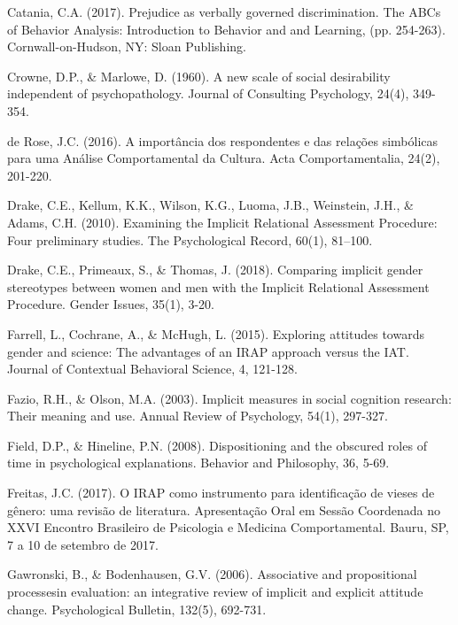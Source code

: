 \hangindent=25pt
\noindent Catania, C.A. (2017). Prejudice as verbally governed discrimination. The ABCs of Behavior Analysis: Introduction to Behavior and and Learning, (pp. 254-263). Cornwall-on-Hudson, NY: Sloan Publishing. 

\hangindent=25pt
\noindent Crowne, D.P., \& Marlowe, D. (1960). A new scale of social desirability independent of psychopathology. Journal of Consulting Psychology, 24(4), 349-354.

\hangindent=25pt
\noindent de Rose, J.C. (2016). A importância dos respondentes e das relações simbólicas para uma Análise Comportamental da Cultura. Acta Comportamentalia, 24(2), 201-220.

\hangindent=25pt
\noindent Drake, C.E., Kellum, K.K., Wilson, K.G., Luoma, J.B., Weinstein, J.H., \& Adams, C.H. (2010). Examining the Implicit Relational Assessment Procedure: Four preliminary studies. The Psychological Record, 60(1), 81–100.

\hangindent=25pt
\noindent Drake, C.E., Primeaux, S., \& Thomas, J. (2018). Comparing implicit gender stereotypes between women and men with the Implicit Relational Assessment Procedure. Gender Issues, 35(1), 3-20.

\hangindent=25pt
\noindent Farrell, L., Cochrane, A., \& McHugh, L. (2015). Exploring attitudes towards gender and science: The advantages of an IRAP approach versus the IAT. Journal of Contextual Behavioral Science, 4, 121-128.

\hangindent=25pt
\noindent Fazio, R.H., \& Olson, M.A. (2003). Implicit measures in social cognition research: Their meaning and use. Annual Review of Psychology, 54(1), 297-327.

\hangindent=25pt
\noindent Field, D.P., \& Hineline, P.N. (2008). Dispositioning and the obscured roles of time in psychological explanations. Behavior and Philosophy, 36, 5-69.

\hangindent=25pt
\noindent Freitas, J.C. (2017). O IRAP como instrumento para identificação de vieses de gênero: uma revisão de literatura. Apresentação Oral em Sessão Coordenada no XXVI Encontro Brasileiro de Psicologia e Medicina Comportamental. Bauru, SP, 7 a 10 de setembro de 2017.

\hangindent=25pt
\noindent Gawronski, B., \& Bodenhausen, G.V. (2006). Associative and propositional processesin evaluation: an integrative review of implicit and explicit attitude change. Psychological Bulletin, 132(5), 692-731.

